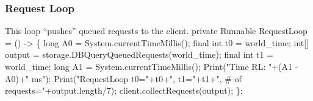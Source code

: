 \documentclass{article}
\def\nwendcode{\endtrivlist \endgroup}      %
\let\nwdocspar=\par
\begin{document}
\subsubsection{Request Loop}
This loop ``pushes'' queued requests to the client.
\nwenddocs{}\endmoddef{}
private Runnable RequestLoop = () -> \{
  long A0 = System.currentTimeMillis();
  final int t0 = world_time;
  int[] output = storage.DBQueryQueuedRequests(world_time);
  final int t1 = world_time;
  long A1 = System.currentTimeMillis();
  Print("Time RL: "+(A1 - A0)+" ms");
  Print("RequestLoop t0="+t0+", t1="+t1+", # of requests="+output.length/7);
  client.collectRequests(output);
\};
\eatline
{}\nwendcode{}\nwdocspar
\end{document}
